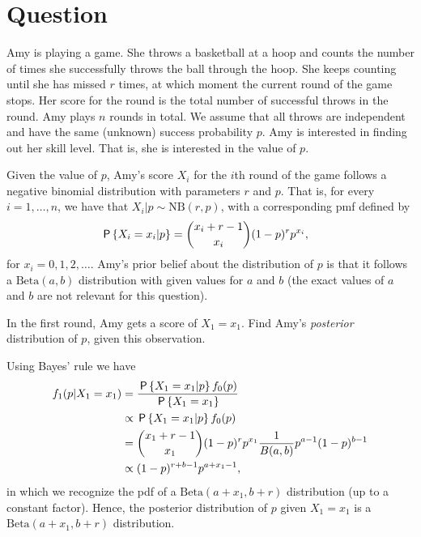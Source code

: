 \section{Question}

Amy is playing a game. She throws a basketball at a hoop and counts the number of times she successfully throws the ball through the hoop. She keeps counting until she has missed $r$ times, at which moment the current round of the game stops. Her score for the round is the total number of successful throws in the round. Amy plays $n$ rounds in total. We assume that all throws are independent and have the same (unknown) success probability $p$. Amy is interested in finding out her skill level. That is, she is interested in the value of $p$.

Given the value of $p$, Amy's score $X_i$ for the $i$th round of the game follows a negative binomial distribution with parameters $r$ and $p$. That is, for every $i=1,\ldots,n$, we have that $X_i|p \sim \text{NB}(r,p)$, with a corresponding pmf defined by
\begin{align}
    \P{X_i = x_i | p} &= {x_i + r - 1 \choose x_i} (1 - p)^r p^{x_i},
\end{align}
for $x_i = 0,1,2,\ldots$. Amy's prior belief about the distribution of $p$ is that it follows a $\text{Beta}(a,b)$ distribution with given values for $a$ and $b$ (the exact values of $a$ and $b$ are not relevant for this question).

\begin{exercise}[2.5]
In the first round, Amy gets a score of $X_1 = x_1$. Find Amy's \textit{posterior} distribution of $p$, given this observation.
\begin{solution}
Using Bayes' rule we have
\begin{align}
    f_1(p|X_1 = x_1) &= \frac{\P{X_1 = x_1 | p} f_0(p)}{\P{X_1 = x_1}} \\
    &\propto \P{X_1 = x_1 | p} f_0(p) \\
    &= {x_1 + r - 1 \choose x_1} (1 - p)^r p^{x_1} \frac{1}{B(a,b)} p^{a-1} (1-p)^{b-1} \\
    &\propto (1 - p)^{r+b-1} p^{a+x_1-1},
\end{align}
in which we recognize the pdf of a $\text{Beta}(a+x_1, b + r)$ distribution (up to a constant factor). Hence, the posterior distribution of $p$ given $X_1 = x_1$ is a $\text{Beta}(a+x_1, b + r)$ distribution.
\end{solution}
\end{exercise}

